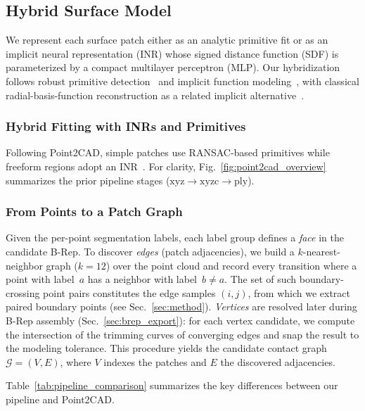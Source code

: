 \documentclass{ieeeaccess}
\begin{document}
\subsection{Hybrid Surface Model}
We represent each surface patch either as an analytic primitive fit
or as an implicit neural representation (INR) whose signed distance function (SDF)
is parameterized by a compact multilayer perceptron (MLP).
Our hybridization follows robust primitive detection~\cite{b15} and implicit function modeling~\cite{b5,b6,b17,b21}, with classical radial-basis-function reconstruction as a related implicit alternative~\cite{b13}.

\subsubsection{Hybrid Fitting with INRs and Primitives}
Following Point2CAD, simple patches use RANSAC-based primitives while freeform regions adopt an INR~\cite{b2,b15,b5,b17,b6,b21}. For clarity, Fig.~\ref{fig:point2cad_overview} summarizes the prior pipeline stages ($\text{xyz} \rightarrow \text{xyzc} \rightarrow \text{ply}$).

\subsubsection{From Points to a Patch Graph}
\label{sec:patch_graph}
Given the per-point segmentation labels, each label group defines a \emph{face} in the candidate B-Rep.
To discover \emph{edges} (patch adjacencies), we build a $k$-nearest-neighbor graph ($k{=}12$) over the point cloud and record every transition where a point with label~$a$ has a neighbor with label~$b{\neq}a$.
The set of such boundary-crossing point pairs constitutes the edge samples $(i,j)$, from which we extract paired boundary points (see Sec.~\ref{sec:method}).
\emph{Vertices} are resolved later during B-Rep assembly (Sec.~\ref{sec:brep_export}): for each vertex candidate, we compute the intersection of the trimming curves of converging edges and snap the result to the modeling tolerance.
This procedure yields the candidate contact graph $\mathcal{G}=(V,E)$, where $V$ indexes the patches and $E$ the discovered adjacencies.

Table~\ref{tab:pipeline_comparison} summarizes the key differences between our pipeline and Point2CAD.
\end{document}
